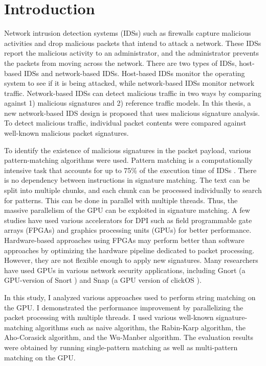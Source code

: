 \chapter{Introduction}
\parindent 0.25in

Network intrusion detection systems (IDSs) such as firewalls capture malicious activities and drop malicious packets that intend to attack a network. These IDSs report the malicious activity to an administrator, and the administrator prevents the packets from moving across the network. There are two types of IDSs, host-based IDSs and network-based IDSs. Host-based IDSs monitor the operating system to see if it is being attacked, while network-based IDSs monitor network traffic. Network-based IDSs can detect malicious traffic in two ways by comparing against 1) malicious signatures and 2) reference traffic models. In this thesis, a new network-based IDS design is proposed that uses malicious signature analysis. To detect malicious traffic, individual packet contents were compared against well-known malicious packet signatures. 

To identify the existence of malicious signatures in the packet payload, various pattern-matching algorithms were used. Pattern matching is a computationally intensive task that accounts for up to 75\% of the execution time of IDSs \cite{bib6}. There is no dependency between instructions in signature matching. The text can be split into multiple chunks, and each chunk can be processed individually to search for patterns. This can be done in parallel with multiple threads. Thus, the massive parallelism of the GPU can be exploited in signature matching. A few studies have used various accelerators for DPI such as field programmable gate arrays (FPGAs) \cite{bib13}\cite{bib24}\cite{bib27} and graphics processing units (GPUs) \cite{bib12}\cite{bib25} for better performance. Hardware-based approaches using FPGAs may perform better than software approaches by optimizing the hardware pipeline dedicated to packet processing. However, they are not flexible enough to apply new signatures. Many researchers have used GPUs in various network security applications, including Gnort \cite{bib10} (a GPU-version of Snort \cite{bib11}) and Snap \cite{bib9} (a GPU version of clickOS \cite{bib7}).

\vspace{\topsep}
\vspace{\topsep}

In this study, I analyzed various approaches used to perform string matching on the GPU. I demonstrated the performance improvement by parallelizing the packet processing with multiple threads. I used various well-known signature-matching algorithms such as naive algorithm, the Rabin-Karp algorithm, the Aho-Corasick algorithm, and the Wu-Manber algorithm. The evaluation results were obtained by running single-pattern matching as well as multi-pattern matching on the GPU.

